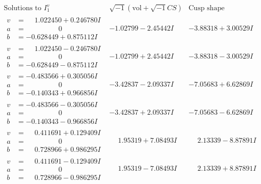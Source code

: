 \documentclass[1p]{elsarticle_modified}
\theoremstyle{definition}
\newcommand{\I}{\sqrt{-1}}
\begin{document}
$$\begin{array}{c|c|c}  
\text{Solutions to }I^v_{1}& \I (\text{vol} + \sqrt{-1}CS) & \text{Cusp shape}\\
 \hline 
\begin{aligned}
v &= \phantom{-}1.022450 + 0.246780 I \\
a &= \phantom{-0.000000 } 0 \\
b &= -0.628449 + 0.875112 I\end{aligned}
 & -1.02799 - 2.45442 I & -3.88318 + 3.00529 I \\ \hline\begin{aligned}
v &= \phantom{-}1.022450 - 0.246780 I \\
a &= \phantom{-0.000000 } 0 \\
b &= -0.628449 - 0.875112 I\end{aligned}
 & -1.02799 + 2.45442 I & -3.88318 - 3.00529 I \\ \hline\begin{aligned}
v &= -0.483566 + 0.305056 I \\
a &= \phantom{-0.000000 } 0 \\
b &= -0.140343 + 0.966856 I\end{aligned}
 & -3.42837 - 2.09337 I & -7.05683 + 6.62869 I \\ \hline\begin{aligned}
v &= -0.483566 - 0.305056 I \\
a &= \phantom{-0.000000 } 0 \\
b &= -0.140343 - 0.966856 I\end{aligned}
 & -3.42837 + 2.09337 I & -7.05683 - 6.62869 I \\ \hline\begin{aligned}
v &= \phantom{-}0.411691 + 0.129409 I \\
a &= \phantom{-0.000000 } 0 \\
b &= \phantom{-}0.728966 + 0.986295 I\end{aligned}
 & \phantom{-}1.95319 + 7.08493 I & \phantom{-}2.13339 - 8.87891 I \\ \hline\begin{aligned}
v &= \phantom{-}0.411691 - 0.129409 I \\
a &= \phantom{-0.000000 } 0 \\
b &= \phantom{-}0.728966 - 0.986295 I\end{aligned}
 & \phantom{-}1.95319 - 7.08493 I & \phantom{-}2.13339 + 8.87891 I \\ \hline\begin{aligned}

\end{aligned}
\end{array}$$
\end{document}
